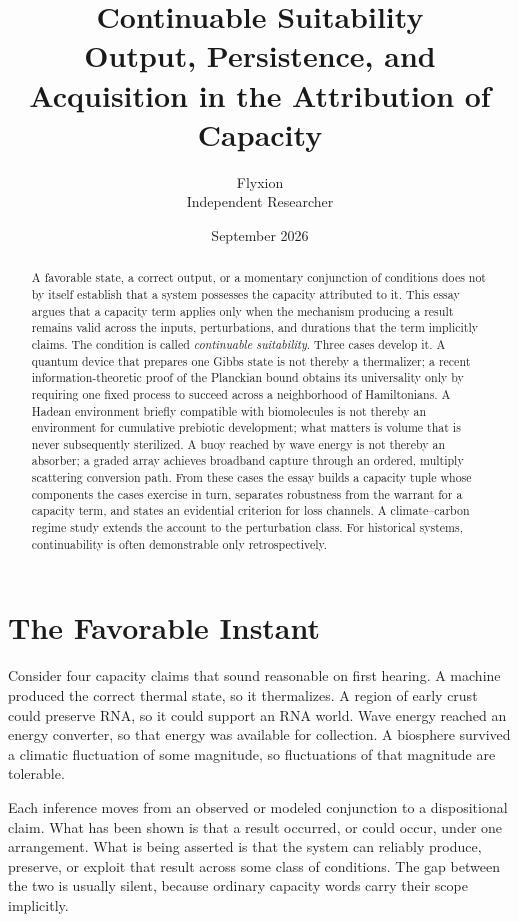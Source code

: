 \documentclass[11pt]{article}
\title{\textbf{Continuable Suitability}\\[0.4em]
\large Output, Persistence, and Acquisition in the Attribution of Capacity}
\author{Flyxion\\ \small Independent Researcher}
\date{September 2026}
\theoremstyle{definition}
\begin{document}
\maketitle

\begin{abstract}
A favorable state, a correct output, or a momentary conjunction of conditions does not by itself establish that a system possesses the capacity attributed to it. This essay argues that a capacity term applies only when the mechanism producing a result remains valid across the inputs, perturbations, and durations that the term implicitly claims. The condition is called \emph{continuable suitability}. Three cases develop it. A quantum device that prepares one Gibbs state is not thereby a thermalizer; a recent information-theoretic proof of the Planckian bound obtains its universality only by requiring one fixed process to succeed across a neighborhood of Hamiltonians. A Hadean environment briefly compatible with biomolecules is not thereby an environment for cumulative prebiotic development; what matters is volume that is never subsequently sterilized. A buoy reached by wave energy is not thereby an absorber; a graded array achieves broadband capture through an ordered, multiply scattering conversion path. From these cases the essay builds a capacity tuple whose components the cases exercise in turn, separates robustness from the warrant for a capacity term, and states an evidential criterion for loss channels. A climate--carbon regime study extends the account to the perturbation class. For historical systems, continuability is often demonstrable only retrospectively.
\end{abstract}


\section{The Favorable Instant}

Consider four capacity claims that sound reasonable on first hearing. A machine produced the correct thermal state, so it thermalizes. A region of early crust could preserve RNA, so it could support an RNA world. Wave energy reached an energy converter, so that energy was available for collection. A biosphere survived a climatic fluctuation of some magnitude, so fluctuations of that magnitude are tolerable.

Each inference moves from an observed or modeled conjunction to a dispositional claim. What has been shown is that a result occurred, or could occur, under one arrangement. What is being asserted is that the system can reliably produce, preserve, or exploit that result across some class of conditions. The gap between the two is usually silent, because ordinary capacity words carry their scope implicitly.
\end{document}
